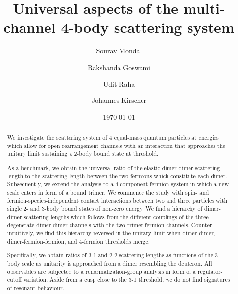 \documentclass[aps,twocolumn,preprintnumbers,amsmath,amssymb,nofootinbib,superscriptaddress,notitlepage]{revtex4-1}
\begin{document}
\title{Universal aspects of the multi-channel 4-body scattering system}
\author{Sourav Mondal}
\author{Rakshanda Goswami}
\author{Udit Raha}
\address{Department of Physics, Indian Institute of Technology Guwahati, Guwahati 781039, India}
\author{Johannes Kirscher}
\address{Department of Physics, SRM University - AP, Amaravati 522502, Andhra Pradesh, India}
\date{\today}

\begin{abstract}
We investigate the scattering system of 4 equal-mass quantum particles at energies
which allow for open rearrangement channels with an interaction that approaches the
unitary limit sustaining a 2-body bound state at threshold.

As a benchmark, we obtain the universal ratio of the elastic dimer-dimer scattering length
to the scattering length between the two fermions which constitute each dimer.
Subsequently, we extend the analysis to a 4-component-fermion system in which a new scale
enters in form of a bound trimer.
We commence the study with spin- and fermion-species-independent contact interactions
between two and three particles with single 2- and 3-body bound states of non-zero energy.
We find a hierarchy of dimer-dimer scattering lengths which follows from the different
couplings of the three degenerate dimer-dimer channels with the two trimer-fermion channels.
Counter-intuitively, we find this hierarchy reversed in the unitary limit when dimer-dimer,
dimer-fermion-fermion, and 4-fermion thresholds merge.

Specifically, we obtain ratios of 3-1 and 2-2 scattering lengths as functions of the 3-body
scale as unitarity is approached from a dimer resembling the deuteron. All observables are
subjected to a renormalization-group analysis in form of a regulator-cutoff variation.
Aside from a cusp close to the 3-1 threshold, we do not find signatures of resonant behaviour. 
\end{abstract}

\maketitle
\end{document}
